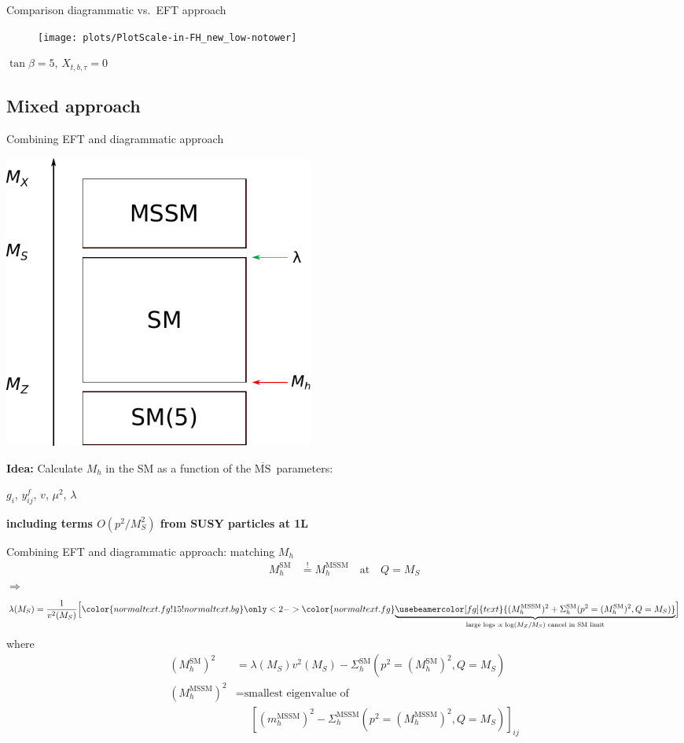 \documentclass[hyperref={pdfpagelabels=false},ngerman]{beamer}
\renewcommand{\emph}{\textbf}
\newcommand{\MSbar}{\ensuremath{\overline{\text{MS}}}}
\newcommand{\SM}{\ensuremath{\text{SM}}}
\begin{document}
\begin{frame}{Comparison diagrammatic vs.\ EFT approach}
  \begin{figure}
    \centering
    \texttt{[image: plots/PlotScale-in-FH\_new\_low-notower]}
  \end{figure}
  $\tan\beta = 5$, $X_{t,b,\tau} = 0$
\end{frame}


\subsection{Mixed approach}

\begin{frame}{Combining EFT and diagrammatic approach}
  \begin{center}
    \includegraphics[width=0.45\textwidth]{images/mssm-sm-tower-eft}\\[1em]
  \end{center}
  \emph{Idea:} Calculate $M_h$ in the SM as a function of the \MSbar\ parameters:\\[1em]
  \begin{center}
    $g_i$, $y^f_{ij}$, $v$, $\mu^2$, $\lambda$
  \end{center}
  \emph{including terms $O(p^2/M_S^2)$ from SUSY particles at 1L}
\end{frame}

\begin{frame}{Combining EFT and diagrammatic approach: matching $M_h$}
  \begin{align*}
    M_h^{\SM} &\overset{!}{=} M_h^\text{MSSM} \quad \text{at} \quad Q = M_S
  \end{align*}
  $\Rightarrow$
  \begin{align*}
    \lambda(M_S) = \frac{1}{v^2(M_S)} \Big[
    {\color{normal text.fg!15!normal text.bg}
    \only<2->{\color{normal text.fg}}{%
    \underbrace{\usebeamercolor[fg]{text}{(M_h^\text{MSSM})^2 + \Sigma^\SM_h(p^2 = (M_h^\SM)^2,Q = M_S)}}_{\text{large logs $\propto\log(M_Z/M_S)$ cancel in SM limit}}}}
    \Big]
  \end{align*}
  where
  \begin{align*}
    (M_h^{\SM})^2 &= \lambda(M_S) v^2(M_S) - \Sigma^{\SM}_h(p^2 = (M_h^{\SM})^2,Q = M_S) \\
    (M_h^\text{MSSM})^2 &= \text{smallest eigenvalue of} \\
    &\phantom{={}} \left[(m_h^\text{MSSM})^2 - \Sigma^\text{MSSM}_h(p^2 = (M_h^\text{MSSM})^2,Q = M_S)\right]_{ij}
  \end{align*}
\end{frame}
\end{document}
